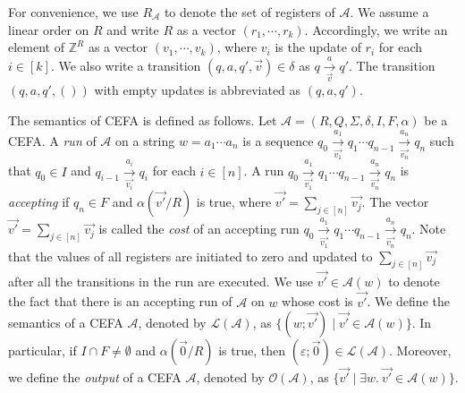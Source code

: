 \documentclass[12pt]{article}
\newcommand*{\aut}{\mathcal{A}}
\newcommand*{\Int}{\mathbb{Z}}
\newcommand*{\myvec}[1]{\vec{#1}}
\newcommand{\cefaout}{\mathcal{O}}
\newcommand{\Lang}{\mathcal{L}}
\theoremstyle{remark}
\begin{document}
For convenience, we use $R_\aut$ to denote the set of registers of $\aut$. We assume a linear order on $R$ and write $R$ as a vector $(r_1, \cdots, r_k)$. Accordingly, we write an element of $\Int^R$ as a vector $(v_1, \cdots, v_k)$, where $v_i$ is the update of $r_i$ for each $i \in [k]$. We also write a transition $(q, a, q', \vec{v}) \in \delta$ as $q \xrightarrow[\vec{v}]{a} q'$. The transition $(q,a,q',())$ with empty updates is abbreviated as $(q,a,q')$.

The semantics of CEFA is defined as follows. Let $\aut = (R, Q, \Sigma, \delta, I, F, \alpha)$ be a CEFA. 
A \emph{run} of $\aut$ on a string $w = a_1 \cdots a_n$ is a sequence $q_0 \xrightarrow[\myvec{v_1}]{a_1} q_1 \cdots q_{n-1}\xrightarrow[\myvec{v_n}]{a_n} q_n$ such that $q_0 \in I$ and $q_{i-1} \xrightarrow[\myvec{v_i}]{a_i} q_i$ for each $i \in [n]$. A run $q_0 \xrightarrow[\myvec{v_1}]{a_1} q_1 \cdots q_{n-1}\xrightarrow[\myvec{v_n}]{a_n} q_n$ is \emph{accepting} if $q_n \in F$ and $\alpha(\myvec{v'}/R)$ is true, where $\myvec{v'} = \sum \limits_{j \in [n]} \myvec{v_j}$. The vector $\myvec{v'}= \sum \limits_{j \in [n]} \myvec{v_j}$ is called the \emph{cost} of an accepting run $q_0 \xrightarrow[\myvec{v_1}]{a_1} q_1 \cdots q_{n-1}\xrightarrow[\myvec{v_n}]{a_n} q_n$. Note that the values of all registers are initiated to zero and updated to $\sum \limits_{j \in [n]} \myvec{v_j}$ after all the transitions in the run are executed. We use $\myvec{v'} \in \aut(w)$ to denote the fact that there is an accepting run of $\aut$ on $w$ whose cost is $\myvec{v'}$.  
We define the semantics of a CEFA $\aut$, denoted by $\Lang(\aut)$, as $\{(w; \myvec{v'}) \mid  \myvec{v'} \in \aut(w)\}$.  In particular, if $I \cap F \neq \emptyset$ and $\alpha(\myvec{0}/R)$ is true, then $(\varepsilon; \myvec{0}) \in \Lang(\aut)$. Moreover, we define the \emph{output} of a CEFA $\aut$, denoted by $\cefaout(\aut)$, as $\{\myvec{v'} \mid  \exists w.\ \myvec{v'} \in \aut(w)\}$.
\end{document}
